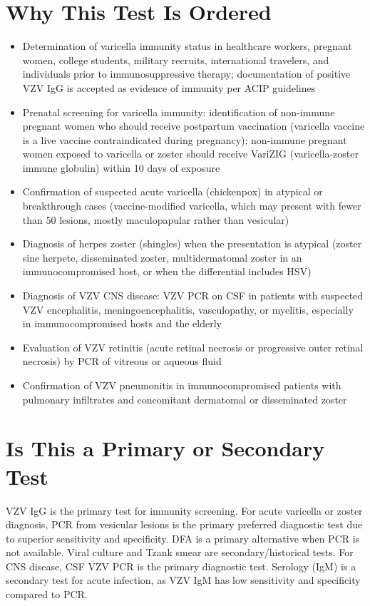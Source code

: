 \section*{Why This Test Is Ordered}
\begin{itemize}
  \item Determination of varicella immunity status in healthcare workers, pregnant women, college students, military recruits, international travelers, and individuals prior to immunosuppressive therapy; documentation of positive VZV IgG is accepted as evidence of immunity per ACIP guidelines
  \item Prenatal screening for varicella immunity: identification of non-immune pregnant women who should receive postpartum vaccination (varicella vaccine is a live vaccine contraindicated during pregnancy); non-immune pregnant women exposed to varicella or zoster should receive VariZIG (varicella-zoster immune globulin) within 10 days of exposure
  \item Confirmation of suspected acute varicella (chickenpox) in atypical or breakthrough cases (vaccine-modified varicella, which may present with fewer than 50 lesions, mostly maculopapular rather than vesicular)
  \item Diagnosis of herpes zoster (shingles) when the presentation is atypical (zoster sine herpete, disseminated zoster, multidermatomal zoster in an immunocompromised host, or when the differential includes HSV)
  \item Diagnosis of VZV CNS disease: VZV PCR on CSF in patients with suspected VZV encephalitis, meningoencephalitis, vasculopathy, or myelitis, especially in immunocompromised hosts and the elderly
  \item Evaluation of VZV retinitis (acute retinal necrosis or progressive outer retinal necrosis) by PCR of vitreous or aqueous fluid
  \item Confirmation of VZV pneumonitis in immunocompromised patients with pulmonary infiltrates and concomitant dermatomal or disseminated zoster
\end{itemize}

\section*{Is This a Primary or Secondary Test}
VZV IgG is the primary test for immunity screening. For acute varicella or zoster diagnosis, PCR from vesicular lesions is the primary preferred diagnostic test due to superior sensitivity and specificity. DFA is a primary alternative when PCR is not available. Viral culture and Tzank smear are secondary/historical tests. For CNS disease, CSF VZV PCR is the primary diagnostic test. Serology (IgM) is a secondary test for acute infection, as VZV IgM has low sensitivity and specificity compared to PCR.

